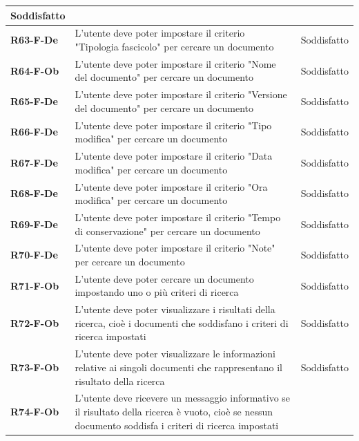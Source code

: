 \documentclass[a4paper,12pt]{article}
\begin{document}
{{{\begin{longtable}{|>{\centering\arraybackslash}m{}|>{\centering\arraybackslash}m{}|>{\centering\arraybackslash}m{}|}
                Soddisfatto \\ 
                \hline
                \textbf{R63-F-De} & L'utente deve poter impostare il criterio "Tipologia fascicolo" per cercare un documento & 
                Soddisfatto \\ 
                \hline
                \textbf{R64-F-Ob} & L'utente deve poter impostare il criterio "Nome del documento" per cercare un documento & 
                Soddisfatto \\ 
                \hline
                \textbf{R65-F-De} & L'utente deve poter impostare il criterio "Versione del documento" per cercare un documento & 
                Soddisfatto \\ 
                \hline
                \textbf{R66-F-De} & L'utente deve poter impostare il criterio "Tipo modifica" per cercare un documento & 
                Soddisfatto \\ 
                \hline
                \textbf{R67-F-De} & L'utente deve poter impostare il criterio "Data modifica" per cercare un documento & 
                Soddisfatto \\ 
                \hline
                \textbf{R68-F-De} & L'utente deve poter impostare il criterio "Ora modifica" per cercare un documento & 
                Soddisfatto \\ 
                \hline
                \textbf{R69-F-De} & L'utente deve poter impostare il criterio "Tempo di conservazione" per cercare un documento & 
                Soddisfatto \\ 
                \hline
                \textbf{R70-F-De} & L'utente deve poter impostare il criterio "Note" per cercare un documento & 
                Soddisfatto \\ 
                \hline
                \textbf{R71-F-Ob} & L'utente deve poter cercare un documento impostando uno o più criteri di ricerca & 
                Soddisfatto \\ 
                \hline
                \textbf{R72-F-Ob} & L'utente deve poter visualizzare i risultati della ricerca, cioè i documenti che soddisfano i criteri di ricerca impostati & 
                Soddisfatto \\ 
                \hline
                \textbf{R73-F-Ob} & L'utente deve poter visualizzare le informazioni relative ai singoli documenti che rappresentano il risultato della ricerca & 
                Soddisfatto \\ 
                \hline
                \textbf{R74-F-Ob} & L'utente deve ricevere un messaggio informativo se il risultato della ricerca è vuoto, cioè se nessun documento soddisfa i criteri di ricerca impostati & 

\end{longtable}}}}
\end{document}
